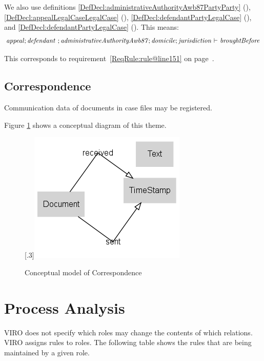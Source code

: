 \documentclass[10pt,a4paper]{report}              %
\theoremstyle{plain}\theorembodyfont{\rmfamily}\newtheorem{definition}{Definition}[section]
\theoremstyle{plain}\theorembodyfont{\rmfamily}\newtheorem{designrule}[definition]{Requirement}
\def\id#1{\mbox{\em #1\/}}
\begin{document}
\begin{description}
We also use definitions \ref{DefDecl:administrativeAuthorityAwb87PartyParty} ({}), \ref{DefDecl:appealLegalCaseLegalCase} ({}), \ref{DefDecl:defendantPartyLegalCase} ({}), and \ref{DefDecl:defendantPartyLegalCase} ({}). 
This means: 
\begin{equation}
   {\id{appeal}};{\id{defendant}}~;{\id{administrativeAuthorityAwb87}};{\id{domicile}};{\id{jurisdiction}}\ {\vdash}\ {\id{broughtBefore}}\label{DefRule:rule@line151}
\end{equation}

This corresponds to requirement~\ref{ReqRule:rule@line151} on page~\pageref{ReqRule:rule@line151}.
\end{description}
\section{Correspondence}

Communication data of documents in case files may be registered.

Figure \ref{fig:PatCorrespondence} shows a conceptual diagram of this theme.

\begin{figure}[htb]
\begin{center}
\scalebox{.3}[.3]{\includegraphics{PatCorrespondence}}
\caption{Conceptual model of Correspondence}
\label{fig:PatCorrespondence}
\end{center}
\end{figure}
\chapter{Process Analysis}\label{chpProcessAnalysis}

VIRO does not specify which roles may change the contents of which relations. 
VIRO assigns rules to roles. The following table shows the rules that are being maintained by a given role.
\end{document}
